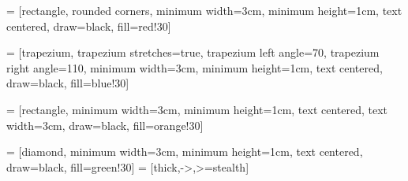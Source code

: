 \usepackage[numbers]{natbib} 

\usepackage[utf8]{inputenc}
\usepackage[T1]{fontenc}
\usepackage[english]{babel}
\usepackage{csquotes}
\usepackage{xcolor}


\usepackage{todonotes}
\newcommand{\question}[2][]{%
    \todo[color=blue!40, #1]{#2}%
}

\usepackage{framed}
\usepackage[bindingoffset=1cm, left=2.5cm, right=2.5cm, top=2.5cm, bottom=2.5cm]{geometry}

\usepackage{fancyhdr}
\pagestyle{fancy}
\renewcommand{\chaptermark}[1]{\markboth{\thechapter\ #1}{}}
\lhead{\leftmark} \rhead{\thepage}
\cfoot{}


\usepackage{color}
\usepackage{colortbl}

\usepackage{tabularx}
\usepackage{multirow}
\setlength{\tabcolsep}{4pt}

\usepackage{pgf}
\usepackage{tikz}
\usetikzlibrary{shapes.geometric,arrows,automata}

 = [rectangle, rounded corners, 
minimum width=3cm, 
minimum height=1cm,
text centered, 
draw=black, 
fill=red!30]

 = [trapezium, 
trapezium stretches=true, %
trapezium left angle=70, 
trapezium right angle=110, 
minimum width=3cm, 
minimum height=1cm, text centered, 
draw=black, fill=blue!30]

 = [rectangle, 
minimum width=3cm, 
minimum height=1cm, 
text centered, 
text width=3cm, 
draw=black, 
fill=orange!30]

 = [diamond, 
minimum width=3cm, 
minimum height=1cm, 
text centered, 
draw=black, 
fill=green!30]
 = [thick,->,>=stealth]

\usepackage{footmisc}

\usepackage{xspace}
\newcommand{\sic}{[\acs{sic}]\xspace}

\usepackage{amsmath}
\usepackage{amssymb}
\usepackage{siunitx}

